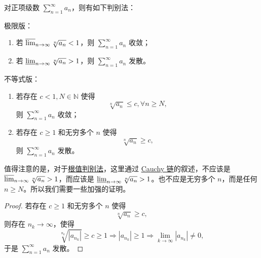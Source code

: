 \documentclass[../../main.tex]{subfiles}%
\begin{document}
\begin{theorem}[根值判别法]\label{theorem:级数-根值判别法}
对正项级数 \(\sum_{n=1}^\infty a_n\)，则有如下判别法：

极限版：
\begin{enumerate}
\item 若 \(\varlimsup_{n \to \infty} \sqrt[n]{a_n} < 1\)，则 \(\sum_{n=1}^\infty a_n\) 收敛；

\item 若 \(\varliminf_{n \to \infty} \sqrt[n]{a_n} > 1\)，则 \(\sum_{n=1}^\infty a_n\) 发散。
\end{enumerate}

不等式版：
\begin{enumerate}
\item 若存在 \( c < 1, N \in \mathbb{N} \) 使得
\[
\sqrt[n]{a_n} \leqslant c, \forall n \geqslant N,
\]
则 \(\sum_{n=1}^\infty a_n\) 收敛；

\item 若存在 \( c \geqslant 1 \) 和无穷多个 \( n \) 使得
\[
\sqrt[n]{a_n} \geqslant c,
\]
则 \(\sum_{n=1}^\infty a_n\) 发散。
\end{enumerate}
\end{theorem}
\begin{remark}
值得注意的是，对于\hyperref[theorem:级数-根值判别法]{根值判别法}，这里通过 \hyperref[theorem:Cauchy链]{Cauchy 链}的叙述，不应该是 \(\varlimsup_{n \to \infty} \sqrt[n]{a_n} > 1\)，而应该是 \(\varliminf_{n \to \infty} \sqrt[n]{a_n} > 1\)。也不应是无穷多个 \( n \)，而是任何 \( n \geqslant N \)。所以我们需要一些加强的证明。
\end{remark}
\begin{proof}
若存在 \( c \geqslant 1 \) 和无穷多个 \( n \) 使得
\[
\sqrt[n]{a_n} \geqslant c,
\]
则存在 \( n_k \to \infty \)，使得
\[
\sqrt[n_k]{|a_{n_k}|} \geqslant c \geqslant 1 \Rightarrow |a_{n_k}| \geqslant 1 \Rightarrow \lim_{k \to \infty} |a_{n_k}| \neq 0,
\]
于是 \(\sum_{n=1}^\infty a_n\) 发散。
\end{proof}
 
\end{document}
